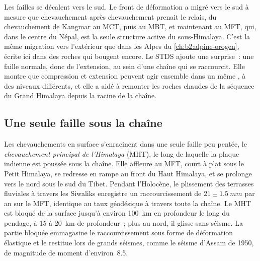 Les failles se décalent vers le sud. Le front de déformation a migré vers le sud à mesure que
chevauchement après chevauchement prenait le relais, du chevauchement de Kangmar au MCT, puis au
MBT, et maintenant au MFT, qui, dans le centre du Népal, est la seule structure active du
sous-Himalaya. C'est la même migration vers l'extérieur que dans les Alpes du \cref{ch:b2:alpine-orogen},
écrite ici dans des roches qui bougent encore. Le STDS ajoute une surprise~: une faille
normale, donc de l'extension, au sein d'une chaîne qui se raccourcit. Elle montre que compression
et extension peuvent agir ensemble dans un même , à des niveaux différents, et elle a aidé
à remonter les roches chaudes de la séquence du Grand Himalaya depuis la racine de la chaîne.

\subsection{Une seule faille sous la chaîne}

Les chevauchements en surface s'enracinent dans une seule faille peu pentée, le \emph{chevauchement
principal de l'Himalaya} (MHT), le long de laquelle la plaque indienne est poussée sous la chaîne. Elle
affleure au MFT, court à plat sous le Petit Himalaya, se redresse en rampe au front du Haut Himalaya, et se
prolonge vers le nord sous le sud du Tibet. Pendant l'Holocène, le plissement des terrasses fluviales à
travers les Siwaliks enregistre un raccourcissement de $21 \pm \qty{1.5}{mm}$ par an sur le MFT, identique
au taux géodésique à travers toute la chaîne. Le MHT est bloqué de la surface jusqu'à environ
\qty{100}{km} en profondeur le long du pendage, à 15 à \qty{20}{km} de profondeur~; plus au nord, il glisse
sans séisme. La partie bloquée emmagasine le raccourcissement sous forme de déformation élastique et le
restitue lors de grands séismes, comme le séisme d'Assam de 1950, de magnitude de moment d'environ~8.5.

